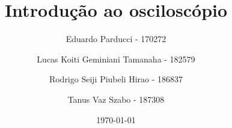 \title{Introdução ao osciloscópio}
\author{
    Eduardo Parducci - 170272
    \and
    Lucas Koiti Geminiani Tamanaha - 182579
    \and
    Rodrigo Seiji Piubeli Hirao - 186837
    \and
    Tanus Vaz Szabo - 187308
}
\date{\today}